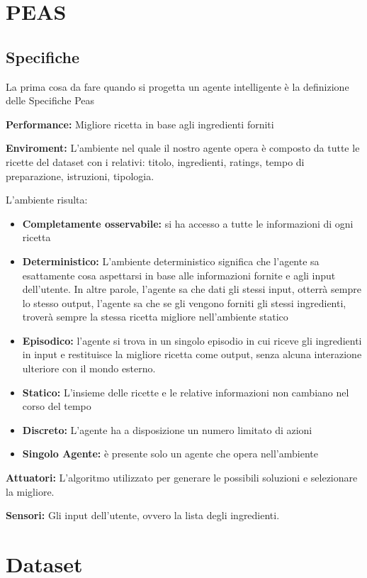 \documentclass[12pt]{report}
\begin{document}
\chapter{PEAS}
\section{Specifiche}
La prima cosa da fare quando si progetta un agente intelligente è la definizione delle Specifiche Peas

\textbf{Performance:} Migliore ricetta in base agli ingredienti forniti

\textbf{Enviroment:} L’ambiente nel quale il nostro agente opera è composto da tutte le ricette del dataset con i relativi: titolo, ingredienti, ratings, tempo di preparazione, istruzioni, tipologia.

L’ambiente risulta:
\begin{itemize}
\item \textbf{Completamente osservabile:} si ha accesso a tutte le informazioni di ogni ricetta
\item \textbf{Deterministico:} L'ambiente deterministico significa che l'agente sa esattamente cosa aspettarsi in base alle informazioni fornite e agli input dell'utente. In altre parole, l'agente sa che dati gli stessi input, otterrà sempre lo stesso output, l'agente sa che se gli vengono forniti gli stessi ingredienti, troverà sempre la stessa ricetta migliore nell'ambiente statico
\item \textbf{Episodico:} l'agente si trova in un singolo episodio in cui riceve gli ingredienti in input e restituisce la migliore ricetta come output, senza alcuna interazione ulteriore con il mondo esterno.
\item \textbf{Statico:} L’insieme delle ricette e le relative informazioni non cambiano nel corso del tempo
\item \textbf{Discreto:} L’agente ha a disposizione un numero limitato di azioni
\item \textbf{Singolo Agente:} è presente solo un agente che opera nell’ambiente
 \end{itemize}

\textbf{Attuatori:} L'algoritmo utilizzato per generare le possibili soluzioni e selezionare la migliore. 

\textbf{Sensori:} Gli input dell'utente, ovvero la lista degli ingredienti.



\chapter{Dataset}
\end{document}
